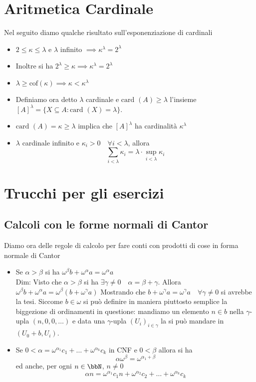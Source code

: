 \documentclass[a4paper,NoNotes,GeneralMath]{stdmdoc}
\newcommand{\card}[1]{\text{card }({#1})}
\newcommand{\cof}[1]{\text{cof}({#1})}
\begin{document}
	\section*{Aritmetica Cardinale}
	Nel seguito diamo qualche risultato sull'esponenziazione di cardinali
	\begin{itemize}
		\item $2 \le \kappa \le \lambda$ e $\lambda$ infinito $\implies \kappa^\lambda = 2^\lambda$
		\item Inoltre si ha $2^\lambda \ge \kappa \implies \kappa^\lambda = 2^\lambda$
		\item $\lambda \ge \cof{\kappa} \implies \kappa < \kappa^\lambda$
		\item Definiamo ora detto $\lambda$ cardinale e $\card{A} \ge \lambda$ l'insieme $[A]^\lambda = \{ X \subseteq A : \card{X} = \lambda \}$.
		\item $\card{A} = \kappa \ge \lambda$ implica che $[A]^\lambda$ ha cardinalità $\kappa^\lambda$
		\item $\lambda$ cardinale infinito e $\kappa_i > 0 \quad \forall i < \lambda$, allora $$ \sum_{i < \lambda} \kappa_i = \lambda \cdot \sup_{i < \lambda} \kappa_i $$ 
	\end{itemize}
	
	\section*{Trucchi per gli esercizi}
	\subsection*{Calcoli con le forme normali di Cantor}
	Diamo ora delle regole di calcolo per fare conti con prodotti di cose in forma normale di Cantor
	\begin{itemize}
		\item Se $\alpha > \beta$ si ha $\omega^\beta b + \omega^\alpha a = \omega^\alpha a$ \\
			Dim: Visto che $\alpha > \beta$ si ha $\exists \gamma \neq 0 \quad \alpha = \beta + \gamma$. Allora $\omega^\beta b + \omega^\alpha a = \omega^\beta (b + \omega^\gamma a)$ Mostrando che $b + \omega^\gamma a = \omega^\gamma a \quad \forall \gamma \neq 0$ si avrebbe la tesi. Siccome $b \in \omega$ si può definire in maniera piuttosto semplice la biggezione di ordinamenti in questione: mandiamo un elemento $n \in b$ nella $\gamma$-upla $(n, 0, 0, \ldots)$ e data una $\gamma$-upla $(U_i)_{i \in \gamma}$ la si può mandare in $(U_0 + b, U_i)$.
		\item Se $0 < \alpha = \omega^{\alpha_1} c_1 + \ldots + \omega^{\alpha_k} c_k$ in CNF e $0 < \beta$ allora si ha
			$$ \alpha \omega^\beta = \omega^{\alpha_1 + \beta} $$ ed anche, per ogni $n \in \bbN$, $n \neq 0$
			$$ \alpha n = \omega^{\alpha_1} c_1 n + \omega^{\alpha_2} c_2 + \ldots + \omega^{\alpha_k} c_k $$
	\end{itemize}
\end{document}
